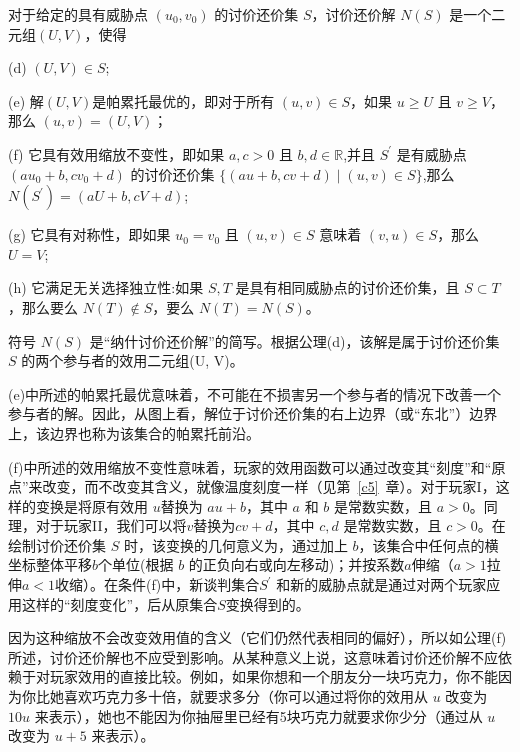 \begin{definition}[讨价还价解的公理]\label{def:11.2}
对于给定的具有威胁点 \(\left( {{u}_{0},{v}_{0}}\right)\) 的讨价还价集 \(S\)，讨价还价解 \(N\left( S\right)\) 是一个二元组$(U,V)$，使得

(d) \(\left( {U,V}\right)  \in  S\);

(e) 解$(U, V)$是帕累托最优的，即对于所有 \(\left( {u,v}\right)  \in  S\)，如果 \(u \geq  U\) 且 \(v \geq  V\)，那么 \(\left( {u,v}\right)  = \left( {U,V}\right)\)；

(f) 它具有效用缩放不变性，即如果 \(a,c > 0\) 且 \(b,d \in  \mathbb{R}\),并且 \({S}^{\prime }\) 是有威胁点 \(\left( {a{u}_{0} + b,c{v}_{0} + d}\right)\) 的讨价还价集 \(\{ \left( {{au} + b,{cv} + d}\right)  \mid  \left( {u,v}\right)  \in  S\}\),那么 \(N\left( {S}^{\prime }\right)  = \left( {{aU} + b,{cV} + d}\right)\);

(g) 它具有对称性，即如果 \({u}_{0} = {v}_{0}\) 且 \(\left( {u,v}\right)  \in  S\) 意味着 \(\left( {v,u}\right)  \in  S\)，那么 \(U = V\);

(h) 它满足无关选择独立性:如果 \(S,T\) 是具有相同威胁点的讨价还价集，且 \(S \subset  T\)，那么要么 \(N\left( T\right)  \notin  S\)，要么 \(N\left( T\right)  = N\left( S\right)\)。
\end{definition}

符号 \(N\left( S\right)\) 是“纳什讨价还价解”的简写。根据公理(d)，该解是属于讨价还价集 \(S\) 的两个参与者的效用二元组(U, V)。

(e)中所述的帕累托最优意味着，不可能在不损害另一个参与者的情况下改善一个参与者的解。因此，从图上看，解位于讨价还价集的右上边界（或“东北”）边界上，该边界也称为该集合的帕累托前沿。

(f)中所述的效用缩放不变性意味着，玩家的效用函数可以通过改变其“刻度”和“原点”来改变，而不改变其含义，就像温度刻度一样（见第~\ref{c5}~章）。对于玩家I，这样的变换是将原有效用 \(u\)替换为 \({au} + b\)，其中 \(a\) 和 \(b\) 是常数实数，且 \(a > 0\)。同理，对于玩家II，我们可以将\(v\)替换为\({cv} + d\)，其中 \(c,d\) 是常数实数，且 \(c > 0\)。在绘制讨价还价集 \(S\) 时，该变换的几何意义为，通过加上 \(b\)，该集合中任何点的横坐标整体平移\(b\)个单位(根据 \(b\) 的正负向右或向左移动)；并按系数\(a\)伸缩（\(a > 1\)拉伸\(a < 1\)收缩）。在条件(f)中，新谈判集合\({S}^{\prime }\) 和新的威胁点就是通过对两个玩家应用这样的“刻度变化”，后从原集合\(S\)变换得到的。

因为这种缩放不会改变效用值的含义（它们仍然代表相同的偏好），所以如公理(f)所述，讨价还价解也不应受到影响。从某种意义上说，这意味着讨价还价解不应依赖于对玩家效用的直接比较。例如，如果你想和一个朋友分一块巧克力，你不能因为你比她喜欢巧克力多十倍，就要求多分（你可以通过将你的效用从 \(u\) 改变为 \({10u}\) 来表示），她也不能因为你抽屉里已经有5块巧克力就要求你少分（通过从 \(u\) 改变为 \(u + 5\) 来表示）。

